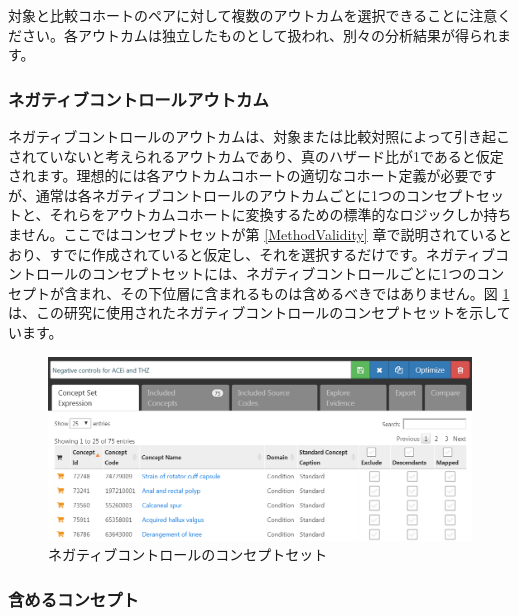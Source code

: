 \documentclass[
  11pt]{book}
\theoremstyle{definition}
\theoremstyle{definition}
\theoremstyle{definition}
\theoremstyle{definition}
\theoremstyle{remark}
\begin{document}
対象と比較コホートのペアに対して複数のアウトカムを選択できることに注意ください。各アウトカムは独立したものとして扱われ、別々の分析結果が得られます。

\subsubsection*{ネガティブコントロールアウトカム}\label{ux30cdux30acux30c6ux30a3ux30d6ux30b3ux30f3ux30c8ux30edux30fcux30ebux30a2ux30a6ux30c8ux30abux30e0}

ネガティブコントロールのアウトカムは、対象または比較対照によって引き起こされていないと考えられるアウトカムであり、真のハザード比が1であると仮定されます。理想的には各アウトカムコホートの適切なコホート定義が必要ですが、通常は各ネガティブコントロールのアウトカムごとに1つのコンセプトセットと、それらをアウトカムコホートに変換するための標準的なロジックしか持ちません。ここではコンセプトセットが第 \ref{MethodValidity} 章で説明されているとおり、すでに作成されていると仮定し、それを選択するだけです。ネガティブコントロールのコンセプトセットには、ネガティブコントロールごとに1つのコンセプトが含まれ、その下位層に含まれるものは含めるべきではありません。図 \ref{fig:ncConceptSet} は、この研究に使用されたネガティブコントロールのコンセプトセットを示しています。

\begin{figure}

{\centering \includegraphics[width=1\linewidth]{images/PopulationLevelEstimation/ncConceptSet} 

}

\caption{ネガティブコントロールのコンセプトセット}\label{fig:ncConceptSet}
\end{figure}

\subsubsection*{含めるコンセプト}\label{ux542bux3081ux308bux30b3ux30f3ux30bbux30d7ux30c8}
\end{document}
